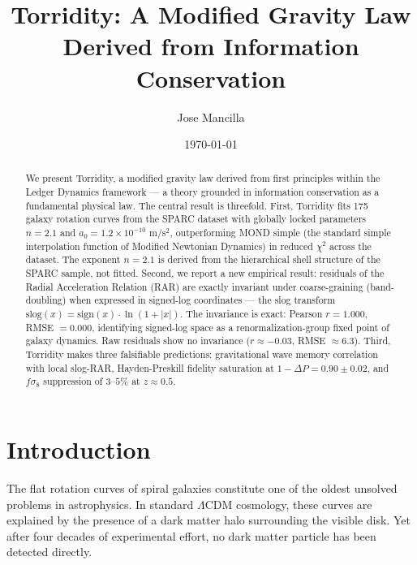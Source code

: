 \documentclass[aps,prl,twocolumn,superscriptaddress,nofootinbib]{revtex4-2}
\begin{document}
\title{Torridity: A Modified Gravity Law Derived from Information Conservation}

\author{Jose Mancilla}

\date{\today}

\begin{abstract}
We present Torridity, a modified gravity law derived from first principles within the Ledger Dynamics framework — a theory grounded in information conservation as a fundamental physical law. The central result is threefold. First, Torridity fits 175 galaxy rotation curves from the SPARC dataset with globally locked parameters $n = 2.1$ and $a_0 = 1.2 \times 10^{-10}$ m/s$^2$, outperforming MOND simple (the standard simple interpolation function of Modified Newtonian Dynamics) in reduced $\chi^2$ across the dataset. The exponent $n = 2.1$ is derived from the hierarchical shell structure of the SPARC sample, not fitted. Second, we report a new empirical result: residuals of the Radial Acceleration Relation (RAR) are exactly invariant under coarse-graining (band-doubling) when expressed in signed-log coordinates — the slog transform $\mathrm{slog}(x) = \mathrm{sign}(x) \cdot \ln(1 + |x|)$. The invariance is exact: Pearson $r = 1.000$, RMSE $= 0.000$, identifying signed-log space as a renormalization-group fixed point of galaxy dynamics. Raw residuals show no invariance ($r \approx -0.03$, RMSE $\approx 6.3$). Third, Torridity makes three falsifiable predictions: gravitational wave memory correlation with local slog-RAR, Hayden-Preskill fidelity saturation at $1 - \Delta P = 0.90 \pm 0.02$, and $f\sigma_8$ suppression of $3$--$5\%$ at $z \approx 0.5$.
\end{abstract}

\maketitle

\section{Introduction}

The flat rotation curves of spiral galaxies constitute one of the oldest unsolved problems in astrophysics. In standard $\Lambda$CDM cosmology, these curves are explained by the presence of a dark matter halo surrounding the visible disk. Yet after four decades of experimental effort, no dark matter particle has been detected directly.
\end{document}

